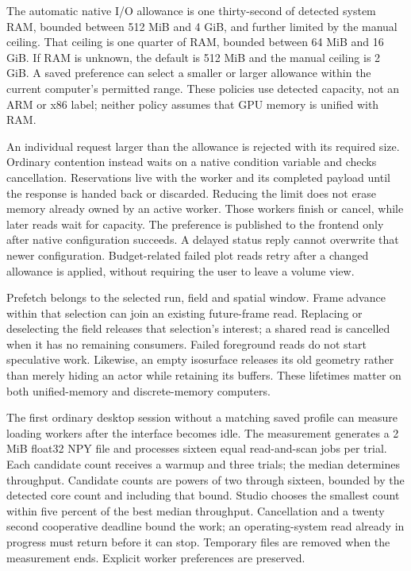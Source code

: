 \documentclass[
  11pt,
]{article}
\begin{document}
The automatic native I/O allowance is one thirty-second of detected system RAM,
bounded between 512 MiB and 4 GiB, and further limited by the manual ceiling.
That ceiling is one quarter of RAM, bounded between 64 MiB and 16 GiB. If RAM
is unknown, the default is 512 MiB and the manual ceiling is 2 GiB. A saved
preference can select a smaller or larger allowance within the current
computer's permitted range. These policies use detected capacity, not an ARM
or x86 label; neither policy assumes that GPU memory is unified with RAM.

An individual request larger than the allowance is rejected with its required
size. Ordinary contention instead waits on a native condition variable and
checks cancellation. Reservations live with the worker and its completed
payload until the response is handed back or discarded. Reducing the limit
does not erase memory already owned by an active worker. Those workers finish
or cancel, while later reads wait for capacity. The preference is published to
the frontend only after native configuration succeeds. A delayed status reply
cannot overwrite that newer configuration. Budget-related failed plot reads
retry after a changed allowance is applied, without requiring the user to
leave a volume view.

Prefetch belongs to the selected run, field and spatial window. Frame advance
within that selection can join an existing future-frame read. Replacing or
deselecting the field releases that selection's interest; a shared read is
cancelled when it has no remaining consumers. Failed foreground reads do not
start speculative work. Likewise, an empty isosurface releases its old
geometry rather than merely hiding an actor while retaining its buffers.
These lifetimes matter on both unified-memory and discrete-memory computers.

The first ordinary desktop session without a matching saved profile can measure
loading workers after the interface becomes idle. The measurement generates a
2 MiB float32 NPY file and processes sixteen equal read-and-scan jobs per trial.
Each candidate count receives a warmup and three trials; the median determines
throughput. Candidate counts are powers of two through sixteen, bounded by the
detected core count and including that bound. Studio chooses the smallest count
within five percent of the best median throughput. Cancellation and a twenty
second cooperative deadline bound the work; an operating-system read already
in progress must return before it can stop. Temporary files are removed when
the measurement ends. Explicit worker preferences are preserved.
\end{document}
